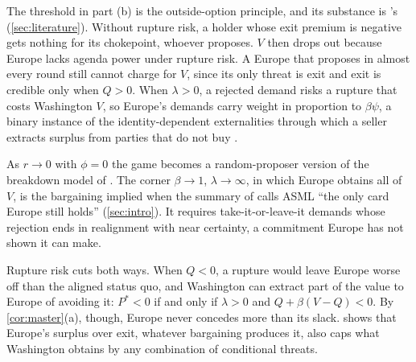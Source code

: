 The threshold in part (b) is the outside-option principle, and its substance is \citeauthor{wagner1988economic}'s (\cref{sec:literature}). Without rupture risk, a holder whose exit premium is negative gets nothing for its chokepoint, whoever proposes. $V$ then drops out because Europe lacks agenda power under rupture risk. A Europe that proposes in almost every round still cannot charge for $V$, since its only threat is exit and exit is credible only when $Q>0$. When $\lambda>0$, a rejected demand risks a rupture that costs Washington $V$, so Europe's demands carry weight in proportion to $\beta\psi$, a binary instance of the identity-dependent externalities through which a seller extracts surplus from parties that do not buy \citep{jehiel1996how}.

As $r\to 0$ with $\phi=0$ the game becomes a random-proposer version of the breakdown model of \citet{binmore1986nash}. The corner $\beta\to 1$, $\lambda\to\infty$, in which Europe obtains all of $V$, is the bargaining implied when the summary of \citet{juijn2026europe} calls ASML ``the only card Europe still holds'' (\cref{sec:intro}). It requires take-it-or-leave-it demands whose rejection ends in realignment with near certainty, a commitment Europe has not shown it can make.

Rupture risk cuts both ways. When $Q<0$, a rupture would leave Europe worse off than the aligned status quo, and Washington can extract part of the value to Europe of avoiding it: $P^*<0$ if and only if $\lambda>0$ and $Q+\beta(V-Q)<0$. By \cref{cor:master}(a), though, Europe never concedes more than its slack.  shows that Europe's surplus over exit, whatever bargaining produces it, also caps what Washington obtains by any combination of conditional threats.

